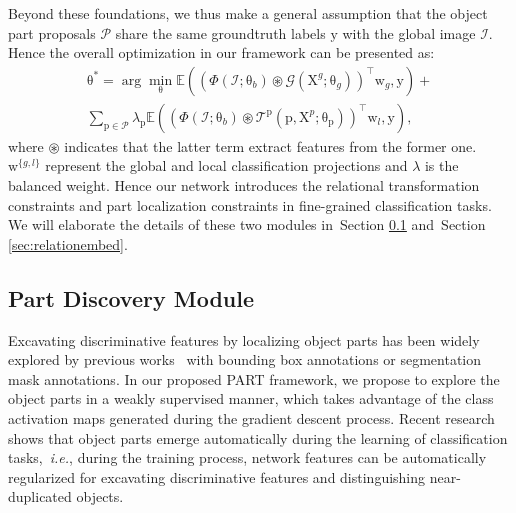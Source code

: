 \documentclass[journal]{IEEEtran}
\def\ie{{\em i.e.}}
\newcommand{\secref}[1]{Section \ref{#1}}
\newcommand{\mc}[1]{\mathcal{#1}}
\newcommand{\br}[1]{\bm{\mathrm{#1}}}
\begin{document}
Beyond these foundations, we thus make a general assumption that the object part proposals $\mc{P}$ share the same groundtruth labels $\br{y}$ with the global image $\mc{I}$. Hence the overall optimization in our framework can be presented as:
\begin{equation}\label{eq:partform}
\begin{split}
\br{\theta}^{*}=\arg\min_{\br{\theta}} \mathbb{E}((\Phi(\mc{I};\br{\theta}_b) \circledast \mc{G}(\br{X}^g;\br{\theta}_{g}) )^{\top}\br{w}_g, \br{y})+ \\
 \sum_{\br{p} \in \mc{P} } \lambda_{\br{p}} \mathbb{E}((\Phi(\mc{I};\br{\theta}_b) \circledast \mc{T}^{\br{p}}(\br{p},\br{X}^p;\br{\theta}_{\br{p}})) ^{\top}  \br{w}_l, \br{y}) ,
\end{split}
\end{equation}
where $\circledast$ indicates that the latter term extract features from the former one. $\br{w}^{ \{ g,l \} }$ represent the global and local classification projections and $\lambda$ is the balanced weight.
Hence our network introduces the relational transformation constraints and part localization constraints in fine-grained classification tasks. We will elaborate the details of these two modules in~\secref{sec:partdis} and~\secref{sec:relationembed}.








\subsection{Part Discovery Module}\label{sec:partdis}
Excavating discriminative features by localizing object parts has been widely explored by previous works~\cite{zhang2014part,huang2016part,he2017weakly,wei2018mask,he2019part,huang2020interpretable} with bounding box annotations or segmentation mask annotations. In our proposed PART framework, we propose to explore the object parts in a weakly supervised manner, which takes advantage of the class activation maps generated during the gradient descent process. Recent research~\cite{gonzalez2018semantic} shows that object parts emerge automatically during the learning of classification tasks,~\ie, during the training process, network features can be automatically regularized for excavating discriminative features and distinguishing near-duplicated objects.
\end{document}
